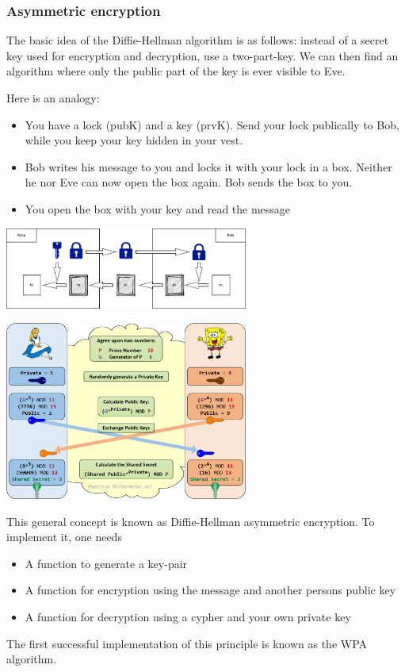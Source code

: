 \subsubsection{Asymmetric encryption}

The basic idea of the Diffie-Hellman algorithm is as follows: instead of a secret key used for encryption and decryption, use a two-part-key. We can then find an algorithm where only the public part of the key is ever visible to Eve. 

Here is an analogy:
\begin{itemize}
	\item You have a lock (pubK) and a key (prvK). Send your lock publically to Bob, while you keep your key hidden in your vest. 
	\item Bob writes his message to you and locks it with your lock in a box. Neither he nor Eve can now open the box again. Bob sends the box to you.
	\item You open the box with your key and read the message
\end{itemize}

\includegraphics[width=0.6\textwidth]{images/async.png} 

\includegraphics[width=0.6\textwidth]{images/diffie_hellmann} 

This general concept is known as Diffie-Hellman asymmetric encryption. To implement it, one needs 
\begin{itemize}
	\item A function to generate a key-pair
	\item A function for encryption using the message and another persons public key
	\item A function for decryption using a cypher and your own private key
\end{itemize}
The first successful implementation of this principle is known as the WPA algorithm. 

